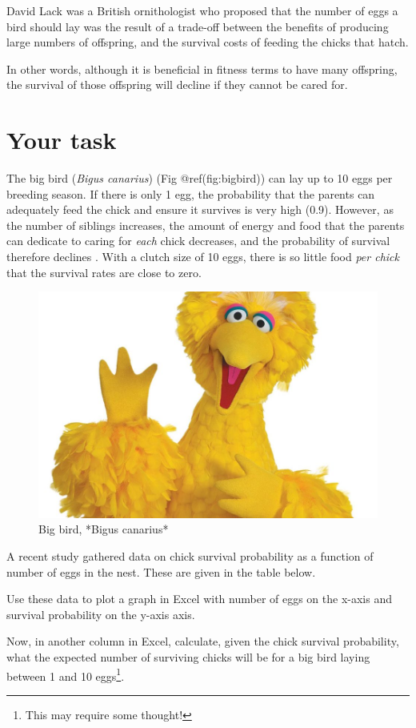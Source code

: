 \documentclass[
  a4paper]{book}
\begin{document}
David Lack was a British ornithologist who proposed that the number of
eggs a bird should lay was the result of a trade-off between the
benefits of producing large numbers of offspring, and the survival costs
of feeding the chicks that hatch.

In other words, although it is beneficial in fitness terms to have many
offspring, the survival of those offspring will decline if they cannot
be cared for.

\hypertarget{your-task-1}{%
\section{Your task}\label{your-task-1}}

The big bird (\emph{Bigus canarius}) (Fig @ref(fig:bigbird)) can lay up
to 10 eggs per breeding season. If there is only 1 egg, the probability
that the parents can adequately feed the chick and ensure it survives is
very high (0.9). However, as the number of siblings increases, the
amount of energy and food that the parents can dedicate to caring for
\emph{each} chick decreases, and the probability of survival therefore
declines . With a clutch size of 10 eggs, there is so little food
\emph{per chick} that the survival rates are close to zero.

\begin{figure}

{\centering \includegraphics[width=0.5\linewidth]{images/bigbird} 

}

\caption{Big bird, *Bigus canarius*}\label{fig:bigbird}
\end{figure}

A recent study gathered data on chick survival probability as a function
of number of eggs in the nest. These are given in the table below.

Use these data to plot a graph in Excel with number of eggs on the
x-axis and survival probability on the y-axis axis.

Now, in another column in Excel, calculate, given the chick survival
probability, what the expected number of surviving chicks will be for a
big bird laying between 1 and 10 eggs\footnote{This may require some
  thought!}.
\end{document}
